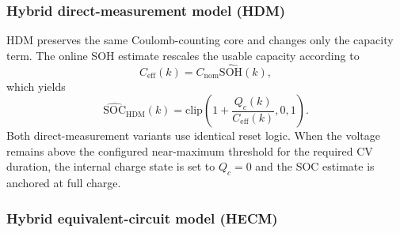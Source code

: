 \subsubsection{Hybrid direct-measurement model (HDM)}

HDM preserves the same Coulomb-counting core and changes only the capacity term. The online SOH estimate rescales the usable capacity according to
\begin{equation}
    C_{\mathrm{eff}}(k)=C_{\mathrm{nom}}\widehat{\mathrm{SOH}}(k),
    \label{eq:robustness_ceff}
\end{equation}
which yields
\begin{equation}
    \widehat{\mathrm{SOC}}_{\mathrm{HDM}}(k)=
    \mathrm{clip}\!\left(1+\frac{Q_c(k)}{C_{\mathrm{eff}}(k)},0,1\right).
    \label{eq:robustness_soc_hdm}
\end{equation}
Both direct-measurement variants use identical reset logic. When the voltage remains above the configured near-maximum threshold for the required CV duration, the internal charge state is set to $Q_c=0$ and the SOC estimate is anchored at full charge.

\subsubsection{Hybrid equivalent-circuit model (HECM)}

